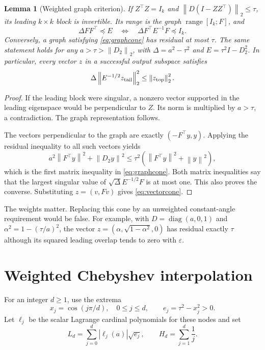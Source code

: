 \documentclass[11pt]{article}
\newtheorem{lemma}[theorem]{Lemma}
\theoremstyle{definition}
\newcommand{\ran}{\operatorname{range}}
\newcommand{\diag}{\operatorname{diag}}
\newcommand{\norm}[1]{\left\lVert#1\right\rVert}
\begin{document}
\begin{lemma}[Weighted graph criterion]\label{lem:cone}
If $Z^\top Z=I_k$ and $\norm{D(I-ZZ^\top)}_2\le\tau$, its leading $k\times k$ block is invertible. Its range is the graph $\ran[I_k;F]$, and
\begin{equation}\label{eq:graphcone}
\Delta FF^\top\preceq E
\quad\Longleftrightarrow\quad
\Delta F^\top E^{-1}F\preceq I_k.
\end{equation}
Conversely, a graph satisfying \eqref{eq:graphcone} has residual at most $\tau$. The same statement holds for any $a>\tau>\norm{D_2}_2$, with $\Delta=a^2-\tau^2$ and $E=\tau^2I-D_2^2$. In particular, every vector $z$ in a successful output subspace satisfies
\begin{equation}\label{eq:vectorcone}
\Delta\norm{E^{-1/2}z_{\rm tail}}_2^2\le\norm{z_{\rm top}}_2^2.
\end{equation}
\end{lemma}
\begin{proof}
If the leading block were singular, a nonzero vector supported in the leading eigenspace would be perpendicular to $Z$. Its norm is multiplied by $a>\tau$, a contradiction. The graph representation follows.

The vectors perpendicular to the graph are exactly $(-F^\top y,y)$. Applying the residual inequality to all such vectors yields
\[
a^2\norm{F^\top y}^2+\norm{D_2y}^2
\le\tau^2(\norm{F^\top y}^2+\norm y^2),
\]
which is the first matrix inequality in \eqref{eq:graphcone}. Both matrix inequalities say that the largest singular value of $\sqrt\Delta E^{-1/2}F$ is at most one. This also proves the converse. Substituting $z=(v,Fv)$ gives \eqref{eq:vectorcone}.
\end{proof}

The weights matter. Replacing this cone by an unweighted constant-angle requirement would be false. For example, with $D=\diag(a,0,1)$ and $\alpha^2=1-(\tau/a)^2$, the vector $z=(\alpha,\sqrt{1-\alpha^2},0)$ has residual exactly $\tau$ although its squared leading overlap tends to zero with $\varepsilon$.

\section{Weighted Chebyshev interpolation}\label{sec:interp}
For an integer $d\ge1$, use the extrema
\[
x_j=\cos(j\pi/d),\quad 0\le j\le d,
\qquad e_j=\tau^2-x_j^2>0.
\]
Let $\ell_j$ be the scalar Lagrange cardinal polynomials for these nodes and set
\begin{equation}\label{eq:L}
L_d=\sum_{j=0}^d|\ell_j(a)|\sqrt{e_j},\qquad
H_d=\sum_{j=1}^d\frac1j.
\end{equation}
\end{document}
